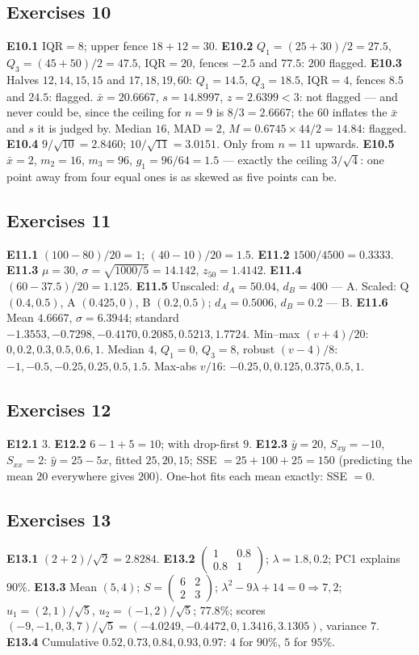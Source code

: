 \documentclass[11pt]{article}
\newcommand{\ans}[1]{\subsection*{#1}}
\newcommand{\IQR}{\mathrm{IQR}}
\newcommand{\MAD}{\mathrm{MAD}}
\begin{document}
\ans{Exercises 10}
\textbf{E10.1} $\IQR = 8$; upper fence $18 + 12 = 30$.
\textbf{E10.2} $Q_1 = (25 + 30)/2 = 27.5$, $Q_3 = (45 + 50)/2 = 47.5$,
$\IQR = 20$, fences $-2.5$ and $77.5$: $200$ flagged.
\textbf{E10.3} Halves $12, 14, 15, 15$ and $17, 18, 19, 60$: $Q_1 = 14.5$,
$Q_3 = 18.5$, $\IQR = 4$, fences $8.5$ and $24.5$: flagged.
$\bar x = 20.6667$, $s = 14.8997$, $z = 2.6399 < 3$: not flagged --- and never
could be, since the ceiling for $n = 9$ is $8/3 = 2.6667$; the $60$ inflates
the $\bar x$ and $s$ it is judged by. Median $16$, $\MAD = 2$, $M = 0.6745
\times 44/2 = 14.84$: flagged.
\textbf{E10.4} $9/\sqrt{10} = 2.8460$; $10/\sqrt{11} = 3.0151$. Only from
$n = 11$ upwards.
\textbf{E10.5} $\bar x = 2$, $m_2 = 16$, $m_3 = 96$, $g_1 = 96/64 = 1.5$ ---
exactly the ceiling $3/\sqrt4$: one point away from four equal ones is as
skewed as five points can be.

\ans{Exercises 11}
\textbf{E11.1} $(100 - 80)/20 = 1$; $(40 - 10)/20 = 1.5$.
\textbf{E11.2} $1500/4500 = 0.3333$.
\textbf{E11.3} $\mu = 30$, $\sigma = \sqrt{1000/5} = 14.142$,
$z_{50} = 1.4142$.
\textbf{E11.4} $(60 - 37.5)/20 = 1.125$.
\textbf{E11.5} Unscaled: $d_A = 50.04$, $d_B = 400$ --- A. Scaled: Q $(0.4,
0.5)$, A $(0.425, 0)$, B $(0.2, 0.5)$; $d_A = 0.5006$, $d_B = 0.2$ --- B.
\textbf{E11.6} Mean $4.6667$, $\sigma = 6.3944$; standard $-1.3553, -0.7298,
-0.4170, 0.2085, 0.5213, 1.7724$. Min--max $(v + 4)/20$: $0, 0.2, 0.3, 0.5,
0.6, 1$. Median $4$, $Q_1 = 0$, $Q_3 = 8$, robust $(v - 4)/8$: $-1, -0.5,
-0.25, 0.25, 0.5, 1.5$. Max-abs $v/16$: $-0.25, 0, 0.125, 0.375, 0.5, 1$.

\ans{Exercises 12}
\textbf{E12.1} $3$.
\textbf{E12.2} $6 - 1 + 5 = 10$; with drop-first $9$.
\textbf{E12.3} $\bar y = 20$, $S_{xy} = -10$, $S_{xx} = 2$: $\hat y = 25 - 5x$,
fitted $25, 20, 15$; SSE $= 25 + 100 + 25 = 150$ (predicting the mean $20$
everywhere gives $200$). One-hot fits each mean exactly: SSE $= 0$.

\ans{Exercises 13}
\textbf{E13.1} $(2 + 2)/\sqrt2 = 2.8284$.
\textbf{E13.2} $\begin{pmatrix}1 & 0.8\\0.8 & 1\end{pmatrix}$; $\lambda = 1.8,
0.2$; PC1 explains $90\%$.
\textbf{E13.3} Mean $(5, 4)$; $S = \begin{pmatrix}6 & 2\\2 & 3\end{pmatrix}$;
$\lambda^2 - 9\lambda + 14 = 0 \Rightarrow 7, 2$; $u_1 = (2,1)/\sqrt5$,
$u_2 = (-1, 2)/\sqrt5$; $77.8\%$; scores $(-9,-1,0,3,7)/\sqrt5 =
(-4.0249, -0.4472, 0, 1.3416, 3.1305)$, variance $7$.
\textbf{E13.4} Cumulative $0.52, 0.73, 0.84, 0.93, 0.97$: $4$ for $90\%$, $5$
for $95\%$.
\end{document}
